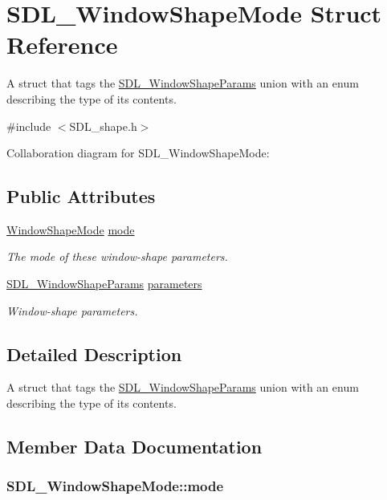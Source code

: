 \hypertarget{struct_s_d_l___window_shape_mode}{\section{S\-D\-L\-\_\-\-Window\-Shape\-Mode Struct Reference}
\label{struct_s_d_l___window_shape_mode}
}


A struct that tags the \hyperlink{union_s_d_l___window_shape_params}{S\-D\-L\-\_\-\-Window\-Shape\-Params} union with an enum describing the type of its contents.  




{\ttfamily \#include $<$S\-D\-L\-\_\-shape.\-h$>$}



Collaboration diagram for S\-D\-L\-\_\-\-Window\-Shape\-Mode\-:
\subsection*{Public Attributes}
\begin{DoxyCompactItemize}
\item 
\hyperlink{_s_d_l__shape_8h_aa30948f2699e316a43b740eccebe5c20}{Window\-Shape\-Mode} \hyperlink{struct_s_d_l___window_shape_mode_a40ebd8b9a76d982cbd87563386cc05de}{mode}
\begin{DoxyCompactList}\small\item\em The mode of these window-\/shape parameters. \end{DoxyCompactList}\item 
\hyperlink{union_s_d_l___window_shape_params}{S\-D\-L\-\_\-\-Window\-Shape\-Params} \hyperlink{struct_s_d_l___window_shape_mode_a2f79bb294034156207fa6d88d3a8c819}{parameters}
\begin{DoxyCompactList}\small\item\em Window-\/shape parameters. \end{DoxyCompactList}\end{DoxyCompactItemize}


\subsection{Detailed Description}
A struct that tags the \hyperlink{union_s_d_l___window_shape_params}{S\-D\-L\-\_\-\-Window\-Shape\-Params} union with an enum describing the type of its contents. 

\subsection{Member Data Documentation}
\hypertarget{struct_s_d_l___window_shape_mode_a40ebd8b9a76d982cbd87563386cc05de}{
\subsubsection[{mode}]{ S\-D\-L\-\_\-\-Window\-Shape\-Mode\-::mode}}\label{struct_s_d_l___window_shape_mode_a40ebd8b9a76d982cbd87563386cc05de}


